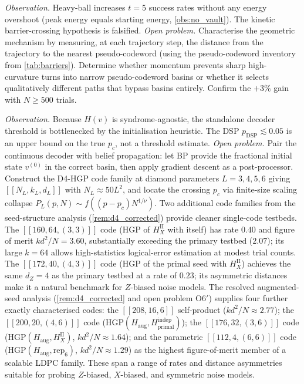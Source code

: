 \documentclass[12pt,a4paper]{article}
\theoremstyle{plain}
\theoremstyle{definition}
\theoremstyle{remark}
\begin{document}
\begin{description}[style=nextline]

\item[(O2$'$) The momentum pathing mechanism.]
\emph{Observation.}
Heavy-ball increases $t=5$ success rates without any energy overshoot
(peak energy equals starting energy, \cref{obs:no_vault}).
The kinetic barrier-crossing hypothesis is falsified.
\emph{Open problem.}
Characterise the geometric mechanism by measuring, at each trajectory
step, the distance from the trajectory to the nearest pseudo-codeword
(using the pseudo-codeword inventory from \cref{tab:barriers}).
Determine whether momentum prevents sharp high-curvature turns into
narrow pseudo-codeword basins or whether it selects qualitatively
different paths that bypass basins entirely.
Confirm the $+3\%$ gain with $N\geq 500$ trials.

\item[(O3$'$) True threshold via BP-initialised decoding.]
\emph{Observation.}
Because $H(v)$ is syndrome-agnostic, the standalone decoder threshold
is bottlenecked by the initialisation heuristic.
The DSP $p_{\mathrm{DSP}} \lesssim 0.05$ is an upper bound on the
true $p_c$, not a threshold estimate.
\emph{Open problem.}
Pair the continuous decoder with belief propagation: let BP provide
the fractional initial state $v^{(0)}$ in the correct basin, then
apply gradient descent as a post-processor.
Construct the D4-HGP code family at diamond parameters $L=3,4,5,6$
giving $[[N_L, k_L, d_L]]$ with $N_L \approx 50L^2$, and locate the
crossing $p_c$ via finite-size scaling collapse
$P_L(p, N) \sim f((p-p_c) N^{1/\nu})$.
Two additional code families from the seed-structure analysis
(\cref{rem:d4_corrected}) provide cleaner single-code testbeds.
The $[[160, 64, (3,3)]]$ code (HGP of $H_X^{\mathrm{II}}$ with itself)
has rate $0.40$ and figure of merit $k d^2 / N = 3.60$, substantially
exceeding the primary testbed ($2.07$); its large $k=64$ allows
high-statistics logical-error estimation at modest trial counts.
The $[[172, 40, (4,3)]]$ code (HGP of the primal seed with
$H_X^{\mathrm{II}}$) achieves the same $d_Z=4$ as the primary testbed
at a rate of $0.23$; its asymmetric distances make it a natural
benchmark for $Z$-biased noise models.
The resolved augmented-seed analysis (\cref{rem:d4_corrected} and
open problem O6$'$) supplies four further exactly characterised codes:
the $[[208,16,6]]$ self-product ($k d^2/N \approx 2.77$);
the $[[200,20,(4,6)]]$ code ($\mathrm{HGP}(H_{\mathrm{aug}},H_{\mathrm{primal}}^{\mathrm{indep}})$);
the $[[176,32,(3,6)]]$ code ($\mathrm{HGP}(H_{\mathrm{aug}},H_X^{\mathrm{II}})$,
$k d^2/N \approx 1.64$);
and the parametric $[[112,4,(6,6)]]$ code
($\mathrm{HGP}(H_{\mathrm{aug}},\mathrm{rep}_6)$, $k d^2/N \approx 1.29$)
as the highest figure-of-merit member of a scalable LDPC family.
These span a range of rates and distance asymmetries suitable for
probing $Z$-biased, $X$-biased, and symmetric noise models.


\end{description}
\end{document}
